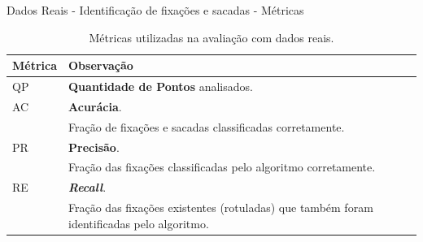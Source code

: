 \documentclass[10pt]{beamer}
\begin{document}
\begin{frame}{Dados Reais - Identificação de fixações e sacadas -  Métricas}
    \begin{table}[h]
        \centering
        \caption{Métricas utilizadas na avaliação com dados reais.}
        \label{tbl:metricas_rbfchain}
        \begin{tabularx}{\textwidth}{lX}
        \toprule
        Métrica  & Observação \\
        \midrule
        QP       &  \textbf{Quantidade de Pontos} analisados. \\
        AC       &  \textbf{Acurácia}.  \\
                 & Fração de fixações e sacadas classificadas corretamente. \\

        PR       &  \textbf{Precisão}.  \\
                 & Fração das fixações classificadas pelo algoritmo corretamente.  \\

        RE       &  \textbf{\textit{Recall}}.  \\
                 & Fração das fixações existentes (rotuladas) que também foram identificadas pelo algoritmo.  \\

        \bottomrule
        \end{tabularx}
        \end{table}
\end{frame}
\end{document}
